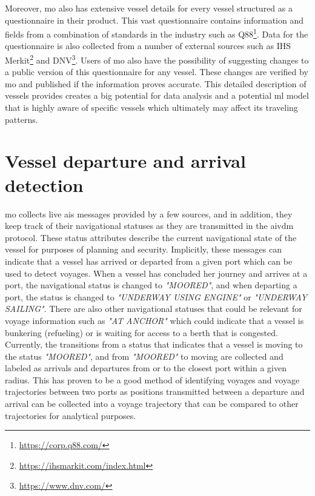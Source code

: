Moreover, \acrshort{mo} also has extensive vessel details for every vessel structured as a questionnaire in their product. This vast questionnaire contains information and fields from a combination of standards in the industry such as Q88\footnote{\url{https://corp.q88.com/}}. Data for the questionnaire is also collected from a number of external sources such as IHS Merkit\footnote{\url{https://ihsmarkit.com/index.html}} and DNV\footnote{\url{https://www.dnv.com/}}. Users of \acrshort{mo} also have the possibility of suggesting changes to a public version of this questionnaire for any vessel. These changes are verified by \acrshort{mo} and published if the information proves accurate. This detailed description of vessels provides creates a big potential for data analysis and a potential \acrshort{ml} model that is highly aware of specific vessels which ultimately may affect its traveling patterns.

\section{Vessel departure and arrival detection}

\acrshort{mo} collects live \acrshort{ais} messages provided by a few sources, and in addition, they keep track of their navigational statuses as they are transmitted in the \gls{aivdm} protocol. These status attributes describe the current navigational state of the vessel for purposes of planning and security. Implicitly, these messages can indicate that a vessel has arrived or departed from a given port which can be used to detect voyages. When a vessel has concluded her journey and arrives at a port, the navigational status is changed to \textit{"MOORED"}, and when departing a port, the status is changed to \textit{"UNDERWAY USING ENGINE"} or \textit{"UNDERWAY SAILING"}. There are also other navigational statuses that could be relevant for voyage information such as \textit{"AT ANCHOR"} which could indicate that a vessel is bunkering (refueling) or is waiting for access to a berth that is congested. Currently, the transitions from a status that indicates that a vessel is moving to the status \textit{"MOORED"}, and from \textit{"MOORED"} to moving are collected and labeled as arrivals and departures from or to the closest port within a given radius. This has proven to be a good method of identifying voyages and voyage trajectories between two ports as positions transmitted between a departure and arrival can be collected into a voyage trajectory that can be compared to other trajectories for analytical purposes.


